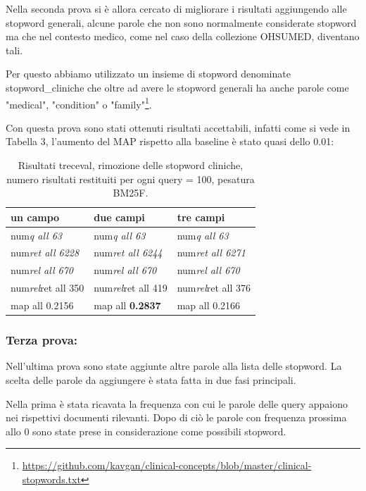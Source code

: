 \documentclass[runningheads]{llncs}
\begin{document}
Nella seconda prova si \`e allora cercato di migliorare i risultati aggiungendo alle stopword generali, alcune parole che non sono normalmente considerate stopword ma che nel contesto medico, come nel caso della collezione OHSUMED, diventano tali.

Per questo abbiamo utilizzato un insieme di stopword denominate stopword\_cliniche che oltre ad avere le stopword generali ha anche parole come "medical", "condition" o "family"\footnote{ \url{https://github.com/kavgan/clinical-concepts/blob/master/clinical-stopwords.txt}}.

Con questa prova sono stati ottenuti risultati accettabili, infatti come si vede in Tabella 3, l'aumento del MAP rispetto alla baseline \`e stato quasi dello 0.01:
\begin{table}
\centering
\begin{tabular}{lll}
\hline
\textbf{ un campo }           & \textbf{ due campi }           & \textbf{ tre campi }            \\ \hline
 num\textit{q all 63 }       &  num\textit{q all 63 }       &  num\textit{q all 63 }        \\
 num\textit{ret all 6228 }  &  num\textit{ret all 6244 }  &  num\textit{ret all 6271 }   \\
 num\textit{rel all 670 }    &  num\textit{rel all 670 }    &  num\textit{rel all 670 }     \\
 num\textit{rel}ret all 350  &  num\textit{rel}ret all 419  &  num\textit{rel}ret all 376   \\
map all 0.2156               & map all \bf 0.2837               & map all 0.2166          \\ \hline
\end{tabular}

\caption{ Risultati treceval, rimozione delle stopword cliniche, numero risultati restituiti per ogni query = 100, pesatura BM25F.}
\end{table}


\subsubsection{Terza prova:}

Nell'ultima prova sono state aggiunte altre parole alla lista delle stopword. La scelta delle parole da aggiungere \`e stata fatta in due fasi principali.

Nella prima \`e stata ricavata la frequenza con cui le parole delle query appaiono nei rispettivi documenti rilevanti. Dopo di ci\`o le parole con frequenza prossima allo 0 sono state prese in considerazione come possibili stopword.
\end{document}
